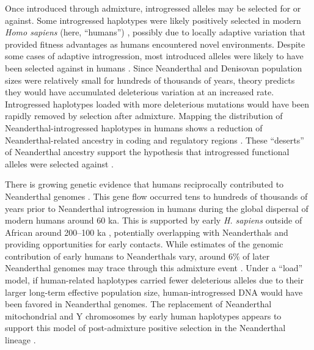 \documentclass{article}
\begin{document}
Once introduced through admixture, introgressed alleles may be selected for or
against. Some introgressed haplotypes were likely positively selected in modern
\emph{Homo sapiens} (here, ``humans'') \citep{huerta2014altitude,
racimo2017signatures, enard2018evidence, gower2021detecting}, possibly due to
locally adaptive variation that provided fitness advantages as humans
encountered novel environments. Despite some cases of adaptive introgression,
most introduced alleles were likely to have been selected against in humans
\citep{harris2016genetic, juric2016strength, veller2023recombination}. Since
Neanderthal and Denisovan population sizes were relatively small for hundreds
of thousands of years, theory predicts they would have accumulated deleterious
variation at an increased rate. Introgressed haplotypes loaded with more
deleterious mutations would have been rapidly removed by selection after
admixture. Mapping the distribution of Neanderthal-introgressed haplotypes in
humans shows a reduction of Neanderthal-related ancestry in coding and
regulatory regions \citep{petr2019limits, telis2020selection,
yermakovich2023long}. These ``deserts'' of Neanderthal ancestry support the
hypothesis that introgressed functional alleles were selected against
\citep{sankararaman2014genomic, sankararaman2016combined}.

There is growing genetic evidence that humans reciprocally contributed to
Neanderthal genomes \citep{kuhlwilm2016ancient, hubisz2020mapping,
harris2023diverse, li2024recurrent}. This gene flow occurred tens to hundreds
of thousands of years prior to Neanderthal introgression in humans during the
global dispersal of modern humans around 60 ka. This is supported by early
\emph{H. sapiens} outside of African around 200--100 ka \citep{schwarcz1988esr,
grun2005u, harvati2019apidima, beyer2021climatic}, potentially overlapping with
Neanderthals and providing opportunities for early contacts. While estimates of
the genomic contribution of early humans to Neanderthals vary, around $6\%$ of
later Neanderthal genomes may trace through this admixture event
\citep{harris2023diverse}. Under a ``load'' model, if human-related haplotypes
carried fewer deleterious alleles due to their larger long-term effective
population size, human-introgressed DNA would have been favored in Neanderthal
genomes. The replacement of Neanderthal mitochondrial and Y chromosomes by
early human haplotypes appears to support this model of post-admixture positive
selection in the Neanderthal lineage \citep{posth2017deeply,
petr2020evolutionary}.
\end{document}
